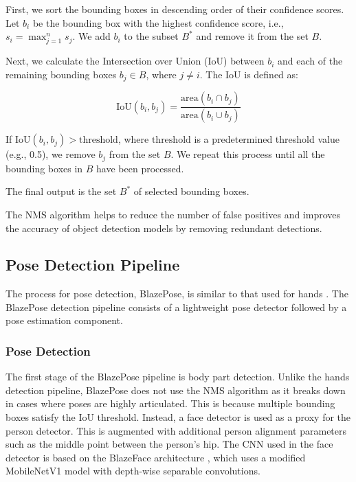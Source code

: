 \documentclass[final,rdr32.tex]{subfiles}
\begin{document}
First, we sort the bounding boxes in descending order of their confidence scores. Let $b_i$ be the bounding box with the highest confidence score, i.e., $s_i = \max_{j=1}^{n} s_j$. We add $b_i$ to the subset $B^*$ and remove it from the set $B$.

Next, we calculate the Intersection over Union (IoU) between $b_i$ and each of the remaining bounding boxes $b_j \in B$, where $j \neq i$. The IoU is defined as:

\begin{equation*}
    \text{IoU}(b_i, b_j) = \frac{\text{area}(b_i \cap b_j)}{\text{area}(b_i \cup b_j)}
\end{equation*}

If $\text{IoU}(b_i, b_j) > \text{threshold}$, where $\text{threshold}$ is a predetermined threshold value (e.g., 0.5), we remove $b_j$ from the set $B$. We repeat this process until all the bounding boxes in $B$ have been processed.

The final output is the set $B^*$ of selected bounding boxes.

The NMS algorithm helps to reduce the number of false positives and improves the accuracy of object detection models by removing redundant detections.

\subsection{Pose Detection Pipeline}

The process for pose detection, BlazePose, is similar to that used for hands \cite{bazarevsky2020blazepose}. The BlazePose detection pipeline consists of a lightweight pose detector followed by a pose estimation component.

\subsubsection{Pose Detection}

The first stage of the BlazePose pipeline is body part detection. Unlike the hands detection pipeline, BlazePose does not use the NMS algorithm as it breaks down in cases where poses are highly articulated. This is because multiple bounding boxes satisfy the IoU threshold. Instead, a face detector is used as a proxy for the person detector. This is augmented with additional person alignment parameters such as the middle point between the person's hip. The CNN used in the face detector is based on the BlazeFace architecture \cite{bazarevsky2019blazeface}, which uses a modified MobileNetV1 model with depth-wise separable convolutions.
\end{document}
